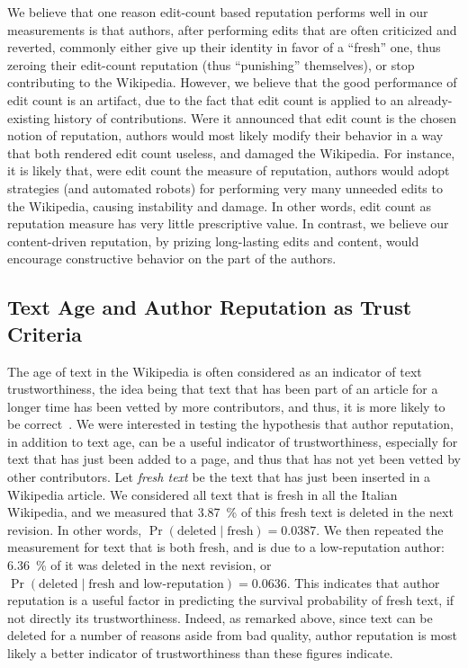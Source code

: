 We believe that one reason edit-count based reputation performs well
in our measurements is that authors, after performing edits that are
often criticized and reverted, commonly either give up their identity
in favor of a ``fresh'' one, thus zeroing their edit-count reputation
(thus ``punishing'' themselves), or stop contributing to the
Wikipedia. 
However, we believe that the good performance of edit count is an
artifact, due to the fact that edit count is applied to an
already-existing history of contributions. 
Were it announced that edit count is the chosen notion of reputation,
authors would most likely modify their behavior in a way that both
rendered edit count useless, and damaged the Wikipedia. 
For instance, it is likely that, were edit count the measure of
reputation, authors would adopt strategies (and automated robots) for
performing very many unneeded edits to the Wikipedia, causing
instability and damage. 
In other words, edit count as reputation measure has very little
prescriptive value. 
In contrast, we believe our content-driven reputation, by prizing
long-lasting edits and content, would encourage constructive behavior
on the part of the authors. 

\subsection{Text Age and Author Reputation as Trust Criteria}

The age of text in the Wikipedia is often considered as an
indicator of text trustworthiness, the idea being that text that has
been part of an article for a longer time has been vetted by more
contributors, and thus, it is more likely to be correct~\cite{Cross2006}. 
We were interested in testing the hypothesis that author reputation,
in addition to text age, can be a useful indicator of
trustworthiness, especially for text that has just been added to a
page, and thus that has not yet been vetted by other contributors.
Let {\em fresh text\/} be the text that has just been inserted in a
Wikipedia article. 
We considered all text that is fresh in all the Italian
Wikipedia, and we measured that 3.87~\% of this fresh text is deleted
in the next revision.  In other words,
$\Pr(\mbox{deleted}\mid\mbox{fresh}) = 0.0387$. 
We then repeated the measurement for text that is both fresh, and is
due to a low-reputation author: 6.36~\% of it was deleted in the next
revision, or 
$\Pr(\mbox{deleted}\mid\mbox{fresh and low-reputation}) = 0.0636$. 
This indicates that author reputation is a useful factor in predicting
the survival probability of fresh text, if not directly its
trustworthiness. 
Indeed, as remarked above, since text can be deleted for a number of
reasons aside from bad quality, author reputation is most likely a
better indicator of trustworthiness than these figures indicate. 


